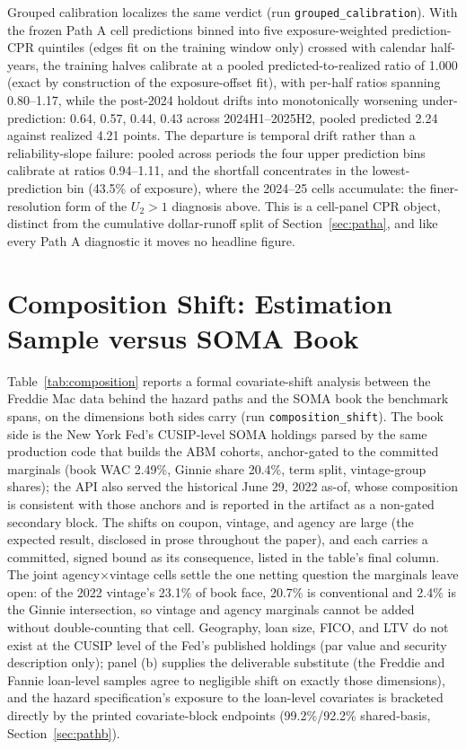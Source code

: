 \documentclass[12pt]{article}
\begin{document}
\begin{table}[H]
\begin{threeparttable}
\begin{tablenotes}[flushleft]
\end{tablenotes}
\end{threeparttable}
\end{table}

Grouped calibration localizes the same verdict (run \texttt{grouped\_calibration}). With the frozen Path A cell predictions binned into five exposure-weighted prediction-CPR quintiles (edges fit on the training window only) crossed with calendar half-years, the training halves calibrate at a pooled predicted-to-realized ratio of 1.000 (exact by construction of the exposure-offset fit), with per-half ratios spanning 0.80--1.17, while the post-2024 holdout drifts into monotonically worsening under-prediction: 0.64, 0.57, 0.44, 0.43 across 2024H1--2025H2, pooled predicted 2.24 against realized 4.21 points. The departure is temporal drift rather than a reliability-slope failure: pooled across periods the four upper prediction bins calibrate at ratios 0.94--1.11, and the shortfall concentrates in the lowest-prediction bin (43.5\% of exposure), where the 2024--25 cells accumulate: the finer-resolution form of the $U_2 > 1$ diagnosis above. This is a cell-panel CPR object, distinct from the cumulative dollar-runoff split of Section~\ref{sec:patha}, and like every Path A diagnostic it moves no headline figure.

\section{Composition Shift: Estimation Sample versus SOMA Book}\label{app:composition}

Table~\ref{tab:composition} reports a formal covariate-shift analysis between the Freddie Mac data behind the hazard paths and the SOMA book the benchmark spans, on the dimensions both sides carry (run \texttt{composition\_shift}). The book side is the New York Fed's CUSIP-level SOMA holdings parsed by the same production code that builds the ABM cohorts, anchor-gated to the committed marginals (book WAC 2.49\%, Ginnie share 20.4\%, term split, vintage-group shares); the API also served the historical June 29, 2022 as-of, whose composition is consistent with those anchors and is reported in the artifact as a non-gated secondary block. The shifts on coupon, vintage, and agency are large (the expected result, disclosed in prose throughout the paper), and each carries a committed, signed bound as its consequence, listed in the table's final column. The joint agency$\times$vintage cells settle the one netting question the marginals leave open: of the 2022 vintage's 23.1\% of book face, 20.7\% is conventional and 2.4\% is the Ginnie intersection, so vintage and agency marginals cannot be added without double-counting that cell. Geography, loan size, FICO, and LTV do not exist at the CUSIP level of the Fed's published holdings (par value and security description only); panel (b) supplies the deliverable substitute (the Freddie and Fannie loan-level samples agree to negligible shift on exactly those dimensions), and the hazard specification's exposure to the loan-level covariates is bracketed directly by the printed covariate-block endpoints (99.2\%/92.2\% shared-basis, Section~\ref{sec:pathb}).
\end{document}
